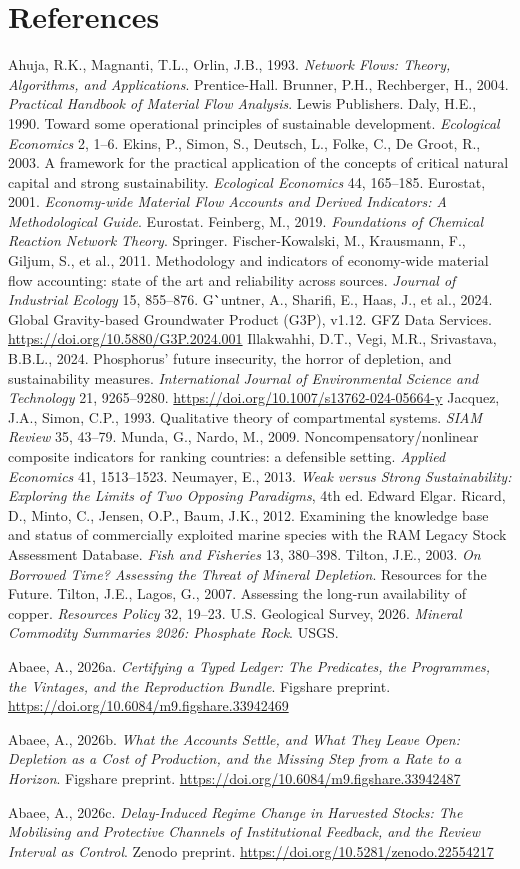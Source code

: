 \documentclass[11pt]{article}
\begin{document}
\section*{References}
Ahuja, R.K., Magnanti, T.L., Orlin, J.B., 1993. \emph{Network Flows: Theory, Algorithms, and Applications}. Prentice-Hall.
Brunner, P.H., Rechberger, H., 2004. \emph{Practical Handbook of Material Flow Analysis}. Lewis Publishers.
Daly, H.E., 1990. Toward some operational principles of sustainable development. \emph{Ecological Economics} 2, 1--6.
Ekins, P., Simon, S., Deutsch, L., Folke, C., De Groot, R., 2003. A framework for the practical application of the concepts of critical natural capital and strong sustainability. \emph{Ecological Economics} 44, 165--185.
Eurostat, 2001. \emph{Economy-wide Material Flow Accounts and Derived Indicators: A Methodological Guide}. Eurostat.
Feinberg, M., 2019. \emph{Foundations of Chemical Reaction Network Theory}. Springer.
Fischer-Kowalski, M., Krausmann, F., Giljum, S., et al., 2011. Methodology and indicators of economy-wide material flow accounting: state of the art and reliability across sources. \emph{Journal of Industrial Ecology} 15, 855--876.
G\``untner, A., Sharifi, E., Haas, J., et al., 2024. Global Gravity-based Groundwater Product (G3P), v1.12. GFZ Data Services. \url{https://doi.org/10.5880/G3P.2024.001}
Illakwahhi, D.T., Vegi, M.R., Srivastava, B.B.L., 2024. Phosphorus' future insecurity, the horror of depletion, and sustainability measures. \emph{International Journal of Environmental Science and Technology} 21, 9265--9280. \url{https://doi.org/10.1007/s13762-024-05664-y}
Jacquez, J.A., Simon, C.P., 1993. Qualitative theory of compartmental systems. \emph{SIAM Review} 35, 43--79.
Munda, G., Nardo, M., 2009. Noncompensatory/nonlinear composite indicators for ranking countries: a defensible setting. \emph{Applied Economics} 41, 1513--1523.
Neumayer, E., 2013. \emph{Weak versus Strong Sustainability: Exploring the Limits of Two Opposing Paradigms}, 4th ed. Edward Elgar.
Ricard, D., Minto, C., Jensen, O.P., Baum, J.K., 2012. Examining the knowledge base and status of commercially exploited marine species with the RAM Legacy Stock Assessment Database. \emph{Fish and Fisheries} 13, 380--398.
Tilton, J.E., 2003. \emph{On Borrowed Time? Assessing the Threat of Mineral Depletion}. Resources for the Future.
Tilton, J.E., Lagos, G., 2007. Assessing the long-run availability of copper. \emph{Resources Policy} 32, 19--23.
U.S. Geological Survey, 2026. \emph{Mineral Commodity Summaries 2026: Phosphate Rock}. USGS.

Abaee, A., 2026a. \emph{Certifying a Typed Ledger: The Predicates, the Programmes, the Vintages, and the Reproduction Bundle}. Figshare preprint. \url{https://doi.org/10.6084/m9.figshare.33942469}

Abaee, A., 2026b. \emph{What the Accounts Settle, and What They Leave Open: Depletion as a Cost of Production, and the Missing Step from a Rate to a Horizon}. Figshare preprint. \url{https://doi.org/10.6084/m9.figshare.33942487}

Abaee, A., 2026c. \emph{Delay-Induced Regime Change in Harvested Stocks: The Mobilising and Protective Channels of Institutional Feedback, and the Review Interval as Control}. Zenodo preprint. \url{https://doi.org/10.5281/zenodo.22554217}
\end{document}
